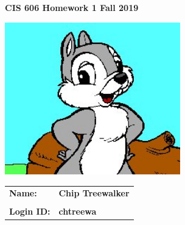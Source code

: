 \documentclass[11pt]{article}
\begin{document}
\thispagestyle{plain}

\begin{center}
{\Large \bf CIS 606 \hfil Homework 1 \hfil Fall 2019} \\
\end{center}

\vskip 1in 

\centerline{\includegraphics[width=3in]{Chip.jpg}}

\vskip 0.5in 

\begin{center}
\begin{tabular}{ll}
{\bf Name:}     & {\bf Chip  Treewalker } \\ \\
{\bf Login ID:} & {\bf chtreewa }   
\end{tabular}
\end{center}

\newpage
\end{document}
